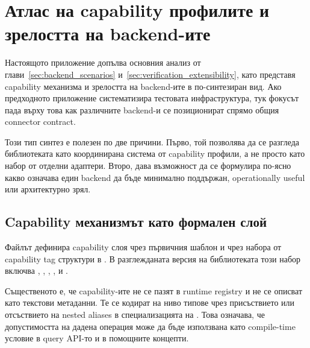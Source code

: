 \section{Атлас на capability профилите и зрелостта на backend-ите}
\label{sec:capability_atlas_appendix}

Настоящото приложение допълва основния анализ от глави~\ref{sec:backend_scenarios} и~\ref{sec:verification_extensibility}, като представя capability механизма и зрелостта на backend-ите в по-синтезиран вид. Ако предходното приложение систематизира тестовата инфраструктура, тук фокусът пада върху това как различните backend-и се позиционират спрямо общия connector contract.

Този тип синтез е полезен по две причини. Първо, той позволява да се разгледа библиотеката като координирана система от capability профили, а не просто като набор от отделни адаптери. Второ, дава възможност да се формулира по-ясно какво означава един backend да бъде минимално поддържан, operationally useful или архитектурно зрял.

\subsection{Capability механизмът като формален слой}

Файлът  дефинира capability слоя чрез първичния шаблон  и чрез набора от capability tag структури в . В разглежданата версия на библиотеката този набор включва , , , ,  и .

Същественото е, че capability-ите не се пазят в runtime registry и не се описват като текстови метаданни. Те се кодират на ниво типове чрез присъствието или отсъствието на nested aliases в специализацията на . Това означава, че допустимостта на дадена операция може да бъде използвана като compile-time условие в query API-то и в помощните концепти.

